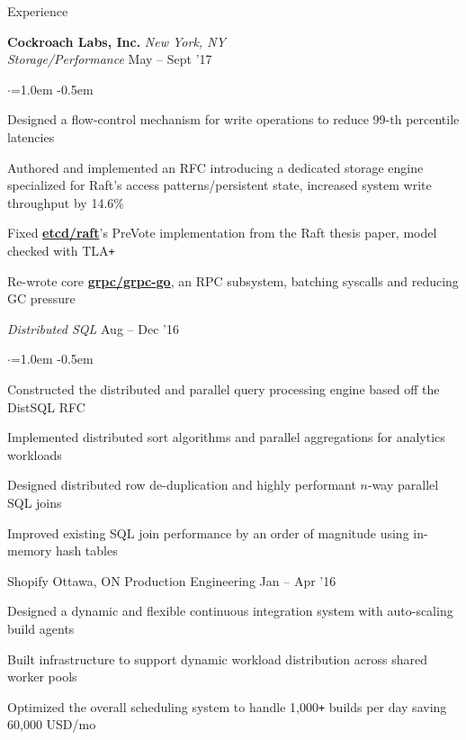 \documentclass{resume} %
\begin{document}
\begin{rSection}{Experience}


  {\bf Cockroach Labs, Inc.}  \hfill  {\em New York, NY}
  \\
  {\em Storage/Performance}  \hfill  {May -- Sept '17}
  \smallskip
  \begin{list}{$\cdot$}{\leftmargin=1.0em}
  \itemsep -0.5em \vspace{-0.5em}
    \item Designed a flow-control mechanism for write operations to reduce 99-th
      percentile latencies
    \item Authored and implemented an RFC introducing a dedicated storage
      engine specialized for Raft's access patterns/persistent state, increased
      system write throughput by 14.6\%
    \item Fixed
      \href{https://github.com/coreos/etcd/pull/8288}{\textbf{etcd/raft}}'s
      PreVote implementation from the Raft thesis paper, model checked with TLA\texttt{+}
    \item Re-wrote core
      \href{https://github.com/grpc/grpc-go}{\textbf{grpc/grpc-go}}, an RPC
      subsystem, batching syscalls and reducing GC pressure

  \end{list}
  {\em Distributed SQL}  \hfill  {Aug -- Dec '16}
  \smallskip
  \begin{list}{$\cdot$}{\leftmargin=1.0em}
  \itemsep -0.5em \vspace{-0.5em}
    \item Constructed the distributed and parallel query processing engine
      based off the DistSQL RFC
    \item Implemented distributed sort algorithms and parallel aggregations for
      analytics workloads
    \item Designed distributed row de-duplication and highly performant $n$-way
      parallel SQL joins
    \item Improved existing SQL join performance by an order of magnitude using
      in-memory hash tables
  \end{list}
  \vspace{0.5em}

  \begin{rSubsection}{Shopify}
                     {Ottawa, ON}
                     {Production Engineering}
                     {Jan -- Apr '16}

  \item Designed a dynamic and flexible continuous integration system with
    auto-scaling build agents
  \item Built infrastructure to support dynamic workload distribution across
    shared worker pools
  \item Optimized the overall scheduling system to handle 1,000\texttt{+} builds per
    day saving 60,000 USD/mo
  \end{rSubsection}


\end{rSection}
\end{document}
